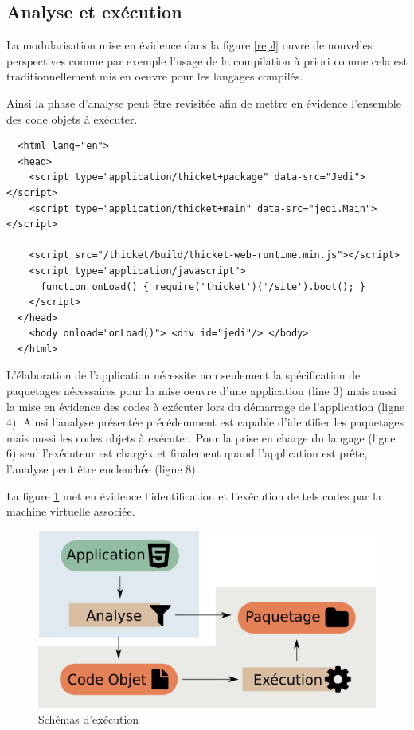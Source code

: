 \documentclass[twoside,a4paper]{article}
\begin{document}
\subsection{Analyse et exécution}

La modularisation mise en évidence  dans la figure \ref{repl} ouvre de
nouvelles perspectives comme  par exemple l'usage de  la compilation à
priori  comme  cela est  traditionnellement  mis  en oeuvre  pour  les
langages compilés.

Ainsi  la  phase d'analyse  peut  être  revisitée  afin de  mettre  en
évidence l'ensemble des code objets à exécuter.

\lstset{language=Html}
\begin{lstlisting}
  <html lang="en">
  <head>
    <script type="application/thicket+package" data-src="Jedi"></script>
    <script type="application/thicket+main" data-src="jedi.Main"></script>

    <script src="/thicket/build/thicket-web-runtime.min.js"></script>    
    <script type="application/javascript">
      function onLoad() { require('thicket')('/site').boot(); }
    </script>
  </head>        
    <body onload="onLoad()"> <div id="jedi"/> </body>
  </html>
\end{lstlisting}

L'élaboration   de   l'application    nécessite   non   seulement   la
spécification  de paquetages  nécessaires  pour la  mise oeuvre  d'une
application  (line 3)  mais  aussi la  mise en  évidence  des codes  à
exécuter lors du démarrage de l'application (ligne 4). Ainsi l'analyse
présentée précédemment  est capable  d'identifier les  paquetages mais
aussi les codes objets à exécuter.  Pour la prise en charge du langage
(ligne   6)  seul   l'exécuteur  est   chargéx  et   finalement  quand
l'application est prête, l'analyse peut être enclenchée (ligne 8).

La   figure  \ref{execute}   met  en   évidence  l'identification   et
l'exécution de tels codes par la machine virtuelle associée.

\begin{figure}[h]
\centering
\includegraphics[scale=0.45]{execute} 
\caption{Schémas d'exécution}
\label{execute}
\end{figure}
\end{document}

